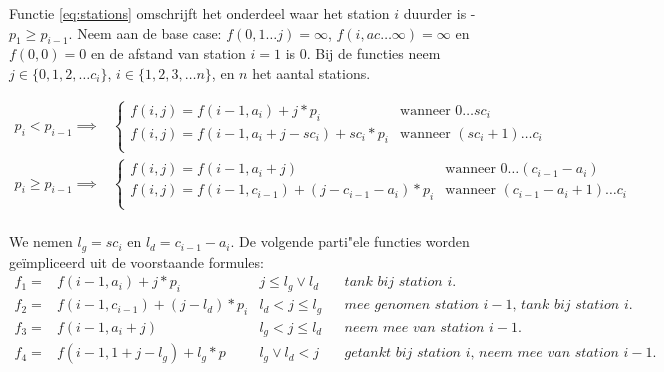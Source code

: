 \documentclass[10pt,tikz]{article}
\begin{document}
Functie \ref{eq:stations} omschrijft het onderdeel waar het station $i$ duurder is - $p_1 \geq p_{i-1}$.
Neem aan de base case: $f(0, 1 \ldots j) = \infty$, $f(i, ac \ldots \infty) = \infty$ en $f(0,0) = 0$ en de afstand van station $i = 1$ is 0.
Bij de functies neem $j \in \{0, 1, 2, \ldots c_i\}$, $i \in \{1, 2, 3, \ldots n\}$, en $n$ het aantal stations.

\begin{equation}
	\begin{aligned}
		p_i < p_{i-1} \implies    &
		\begin{cases}
			f(i,j) = f(i - 1, a_i) + j * p_i               & \text{wanneer } 0 \ldots sc_i         \\
			f(i,j) = f(i - 1, a_i + j - sc_i) + sc_i * p_i & \text{wanneer }  (sc_i +1) \ldots c_i \\
		\end{cases}                  \\
		p_i \geq p_{i-1} \implies &
		\begin{cases}
			f(i,j) = f(i-1, a_i + j)                             & \text{wanneer }  0 \ldots (c_{i-1} - a_i)        \\
			f(i,j) = f(i-1, c_{i-1}) + (j - c_{i-1} - a_i) * p_i & \text{wanneer }  (c_{i-1} - a_i  + 1) \ldots c_i \\
		\end{cases} \\
	\end{aligned}
	\label{eq:stations}
\end{equation}

We nemen $l_g = sc_i$ en $l_d = c_{i-1} - a_i$.
De volgende parti"ele functies worden ge\"impliceerd uit de voorstaande formules:
\begin{equation}
	\begin{aligned}
		f_{1}  = & f(i-1, a_i) + j * p_i             & j \leq l_g \lor l_d &  & \textit{tank bij station $i$.}                                \\
		f_{2}  = & f(i-1, c_{i-1}) + (j - l_d) * p_i & l_d < j \leq l_g    &  & \textit{mee genomen station $i-1$, tank bij station $i$.}     \\
		f_{3}  = & f(i-1, a_i + j)                   & l_g < j \leq l_d    &  & \textit{neem mee van station $i-1$.}                          \\
		f_{4}  = & f(i-1, 1 + j - l_g) + l_g * p     & l_g \lor l_d < j    &  & \textit{getankt bij station $i$, neem mee van station $i-1$.} \\
	\end{aligned}
	\label{eq:partiele_functies}
\end{equation}
\end{document}
